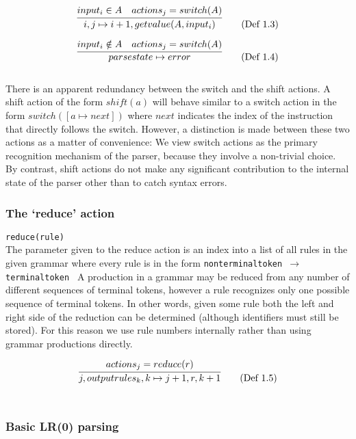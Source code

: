 \documentclass[a4paper,11pt]{article}
\begin{document}
\begin{equation}
\infer{i, j \mapsto i+1, getvalue(A, input_i)}{input_i \in A & actions_j = switch(A)} \tag{Def 1.3}
\end{equation}

\begin{equation}
\infer{parsestate \mapsto error}{input_i \notin A & actions_j = switch(A)} \tag{Def 1.4}
\end{equation}\\

There is an apparent redundancy between the switch and the shift actions. 
A shift action of the form $shift(a)$ will behave similar to a switch action in the form $switch([a \mapsto next])$ where $next$ indicates the index of the instruction that directly follows the switch.
However, a distinction is made between these two actions as a matter of convenience: 
We view switch actions as the primary recognition mechanism of the parser, because they involve a non-trivial choice.
By contrast, shift actions do not make any significant contribution to the internal state of the parser other than to catch syntax errors.
	
\subsubsection{The `reduce' action}
\texttt{reduce(rule)}\\
The parameter given to the reduce action is an index into a list of all rules in the given grammar where every rule is in the form \texttt{nonterminaltoken $\rightarrow$ terminaltoken \textellipsis}
A production in a grammar may be reduced from any number of different sequences of terminal tokens, however a rule recognizes only one possible sequence of terminal tokens.
In other words, given some rule both the left and right side of the reduction can be determined (although identifiers must still be stored).
For this reason we use rule numbers internally rather than using grammar productions directly.

\begin{equation}
\infer{j, outputrules_k, k \mapsto j+1, r, k+1}{actions_j = reduce(r)} \tag{Def 1.5}
\end{equation}\\

\subsubsection{Basic LR(0) parsing}
\end{document}
